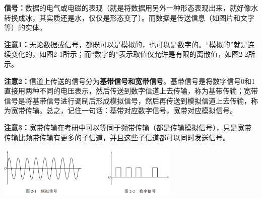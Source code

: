 \textbf{信号：}数据的电气或电磁的表现（就是将数据用另外一种形态表现出来，就好像水转换成冰，其实质还是水，仅仅是形态变了）。而数据是传送信息（如图片和文字等）的实体。

{\textbf{注意1：}}无论数据或信号，都既可以是模拟的，也可以是数字的。``模拟的''就是连续变化的，如图2-1所示；而``数字的''表示取值仅允许是有限的离散值，如图2-2所示。

{\textbf{注意2：}}信道上传送的信号分为\textbf{基带信号和宽带信号}。基带信号是将数字信号0和1直接用两种不同的电压表示，然后传送到数字信道上去传输，称为基带传输；宽带信号是将基带信号进行调制后形成模拟信号，然后再传送到模拟信道上去传输，称为宽带传输。总之，记住一句话：{基带对应数字信号，宽带对应模拟信号。}

{\textbf{注意3：}}宽带传输在考研中可以等同于频带传输（都是传输模拟信号），只是宽带传输比频带传输有更多的子信道，并且这些子信道都可以同时发送信号。

\includegraphics[width=3.43750in,height=0.94792in]{png-jpeg-pics/49645200BFF6E52CA9164749D488B84B.png}
